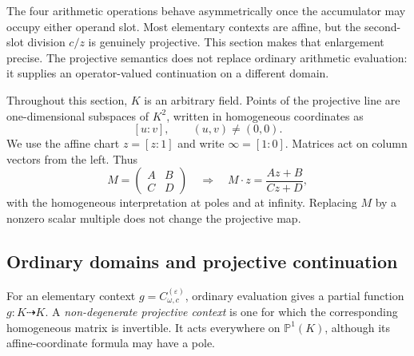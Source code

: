 The four arithmetic operations behave asymmetrically once the accumulator may
occupy either operand slot.  Most elementary contexts are affine, but the
second-slot division $c/z$ is genuinely projective.  This section makes that
enlargement precise.  The projective semantics does not replace ordinary
arithmetic evaluation: it supplies an operator-valued continuation on a
different domain.

Throughout this section, $K$ is an arbitrary field.  Points of the projective
line are one-dimensional subspaces of $K^2$, written in homogeneous coordinates
as
\[
  [u:v],
  \qquad (u,v)\ne(0,0).
\]
We use the affine chart $z=[z:1]$ and write $\infty=[1:0]$.  Matrices act on
column vectors from the left.  Thus
\begin{equation}
  M=\begin{pmatrix}A&B\\ C&D\end{pmatrix}
  \quad\Longrightarrow\quad
  M\cdot z=\frac{Az+B}{Cz+D},
  \label{eq:column-mobius-action}
\end{equation}
with the homogeneous interpretation at poles and at infinity.  Replacing $M$
by a nonzero scalar multiple does not change the projective map.

\subsection{Ordinary domains and projective continuation}

For an elementary context $g=C_{\omega,c}^{(\varepsilon)}$, ordinary
evaluation gives a partial function $g\colon K\dashrightarrow K$.  A
\emph{non-degenerate projective context} is one for which the corresponding
homogeneous matrix is invertible.  It acts everywhere on $\mathbb P^1(K)$,
although its affine-coordinate formula may have a pole.


